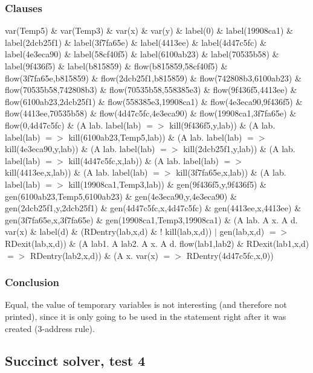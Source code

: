\subsubsection{Clauses}
var(Temp5) \& var(Temp3) \& var(x) \& var(y) \& 
label(0) \& label(19908ca1) \& label(2dcb25f1) \& label(3f7fa65e) \& label(4413ee) \& label(4d47c5fc) \& label(4e3eca90) \& label(58cf40f5) \& label(6100ab23) \& label(70535b58) \& label(9f436f5) \& label(b815859) \& 
flow(b815859,58cf40f5) \& flow(3f7fa65e,b815859) \& flow(2dcb25f1,b815859) \& flow(742808b3,6100ab23) \& flow(70535b58,742808b3) \& flow(70535b58,558385e3) \& flow(9f436f5,4413ee) \& flow(6100ab23,2dcb25f1) \& flow(558385e3,19908ca1) \& flow(4e3eca90,9f436f5) \& flow(4413ee,70535b58) \& flow(4d47c5fc,4e3eca90) \& flow(19908ca1,3f7fa65e) \& flow(0,4d47c5fc) \& 
(A lab. label(lab) $=>$ kill(9f436f5,y,lab)) \& (A lab. label(lab) $=>$ kill(6100ab23,Temp5,lab)) \& (A lab. label(lab) $=>$ kill(4e3eca90,y,lab)) \& (A lab. label(lab) $=>$ kill(2dcb25f1,y,lab)) \& (A lab. label(lab) $=>$ kill(4d47c5fc,x,lab)) \& (A lab. label(lab) $=>$ kill(4413ee,x,lab)) \& (A lab. label(lab) $=>$ kill(3f7fa65e,x,lab)) \& (A lab. label(lab) $=>$ kill(19908ca1,Temp3,lab)) \& 
gen(9f436f5,y,9f436f5) \& gen(6100ab23,Temp5,6100ab23) \& gen(4e3eca90,y,4e3eca90) \& gen(2dcb25f1,y,2dcb25f1) \& gen(4d47c5fc,x,4d47c5fc) \& gen(4413ee,x,4413ee) \& gen(3f7fa65e,x,3f7fa65e) \& gen(19908ca1,Temp3,19908ca1) \& 
(A lab. A x. A d. var(x) \& label(d) \& (RDentry(lab,x,d) \& ! kill(lab,x,d)) $|$ gen(lab,x,d) $=>$ RDexit(lab,x,d)) \& 
(A lab1. A lab2. A x. A d. flow(lab1,lab2) \& RDexit(lab1,x,d) $=>$ RDentry(lab2,x,d)) \& 
(A x. var(x) $=>$ RDentry(4d47c5fc,x,0))
\subsubsection{Conclusion}
Equal, the value of temporary variables is not interesting (and therefore not printed), since it is only going to be used in the statement right after it was created (3-address rule).

\subsection{Succinct solver, test 4}
